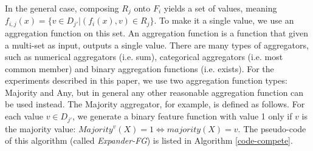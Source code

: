 \documentclass[twoside,11pt]{article}
\theoremstyle{definition}
\begin{document}

In the general case, composing $R_j$ onto $F_i$ yields a set of values, meaning $f_{i,j}(x)=\{v\in D_{j'}|(f_i(x),v)\in R_j\}$. 
To make it a single value, we use an aggregation function on this set.
An aggregation function is a function that given a multi-set as input, outputs a single value. There are many types of aggregators, such as numerical aggregators (i.e. sum), categorical aggregators (i.e. most common member) and binary aggregation functions (i.e. exists).
For the experiments described in this paper, we use  
 two aggregation function types: Majority and Any, but in general any other reasonable aggregation function can be used instead.
The Majority aggregator, for example, is defined as follows.  For each value $v\in D_{j'}$, we generate a binary feature function with value 1 only if $v$ is the majority value: 
$Majority^v(X)=1 \iff majority(X)=v$.
The pseudo-code of this algorithm (called   
\emph{Expander-FG}) is listed in Algorithm \ref{code-compete}.

\end{document}
